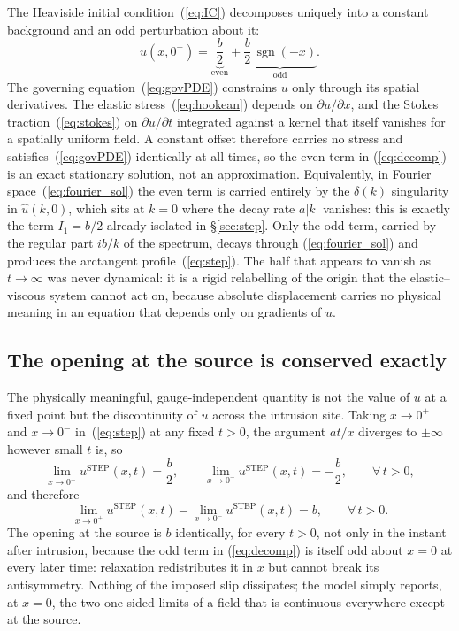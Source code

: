 \documentclass[extra]{gji}
\DeclareMathOperator{\sgn}{sgn}
\begin{document}
The Heaviside initial condition~(\ref{eq:IC}) decomposes uniquely into a
constant background and an odd perturbation about it:
\begin{equation}
u(x,0^+) = \underbrace{\frac{b}{2}}_{\text{even}}
  + \underbrace{\frac{b}{2}\,\sgn(-x)}_{\text{odd}}.
\label{eq:decomp}
\end{equation}
The governing equation~(\ref{eq:govPDE}) constrains $u$ only through its
spatial derivatives. The elastic stress~(\ref{eq:hookean}) depends on
$\partial u/\partial x$, and the Stokes traction~(\ref{eq:stokes}) on
$\partial u/\partial t$ integrated against a kernel that itself vanishes for
a spatially uniform field. A constant offset therefore carries no stress and
satisfies~(\ref{eq:govPDE}) identically at all times, so the even term in
(\ref{eq:decomp}) is an exact stationary solution, not an approximation.
Equivalently, in Fourier space~(\ref{eq:fourier_sol}) the even term is
carried entirely by the $\delta(k)$ singularity in $\hat u(k,0)$, which sits
at $k=0$ where the decay rate $a|k|$ vanishes: this is exactly the term
$I_1=b/2$ already isolated in \S\ref{sec:step}. Only the odd term, carried
by the regular part $ib/k$ of the spectrum, decays through
(\ref{eq:fourier_sol}) and produces the arctangent profile~(\ref{eq:step}).
The half that appears to vanish as $t\to\infty$ was never dynamical: it is
a rigid relabelling of the origin that the elastic--viscous system cannot
act on, because absolute displacement carries no physical meaning in an
equation that depends only on gradients of $u$.

\subsection{The opening at the source is conserved exactly}

The physically meaningful, gauge-independent quantity is not the value of
$u$ at a fixed point but the discontinuity of $u$ across the intrusion
site. Taking $x\to0^+$ and $x\to0^-$ in~(\ref{eq:step}) at any fixed $t>0$,
the argument $at/x$ diverges to $\pm\infty$ however small $t$ is, so
\begin{equation}
\lim_{x\to0^+}u^{\text{STEP}}(x,t) = \frac{b}{2}, \qquad
\lim_{x\to0^-}u^{\text{STEP}}(x,t) = -\frac{b}{2}, \qquad \forall\, t>0,
\label{eq:opening_invariant}
\end{equation}
and therefore
\begin{equation}
\lim_{x\to0^+}u^{\text{STEP}}(x,t) - \lim_{x\to0^-}u^{\text{STEP}}(x,t) = b,
\qquad \forall\, t>0.
\label{eq:opening_conserved}
\end{equation}
The opening at the source is $b$ identically, for every $t>0$, not only in
the instant after intrusion, because the odd term in (\ref{eq:decomp}) is
itself odd about $x=0$ at every later time: relaxation redistributes it in
$x$ but cannot break its antisymmetry. Nothing of the imposed slip
dissipates; the model simply reports, at $x=0$, the two one-sided limits of
a field that is continuous everywhere except at the source.
\end{document}
